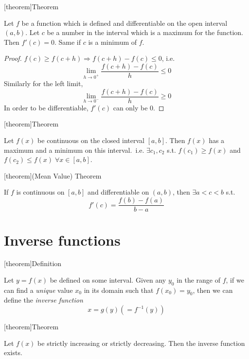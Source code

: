 \documentclass[12pt]{report}
\theoremstyle{definition}
\begin{document}
[theorem]{Theorem}
\begin{max point in an interval}
    Let $f$ be a function which is defined and differentiable on the open interval $(a,b)$.
    Let $c$ be a number in the interval which is a maximum for the function. Then $f'(c) = 0$.
    Same if $c$ is a minimum of $f$.
\end{max point in an interval}
\begin{proof}
    $f(c) \ge f(c+h) \Rightarrow f(c+h) - f(c) \le 0$, i.e.\[
        \lim_{h \rightarrow 0^{+}} \frac{f(c+h) - f(c)}{h} \le 0
    \]Similarly for the left limit, \[
    \lim_{h \rightarrow 0^{-}} \frac{f(c+h) - f(c)}{h} \ge 0
\]In order to be differentiable, $f'(c)$ can only be 0.
\end{proof}

[theorem]{Theorem}
\begin{max and min in an interval}
    Let $f(x)$ be continuous on the closed interval $[a,b]$. 
    Then $f(x)$ has a maximum and a minimum on this interval.\
    i.e. $\exists c_1, c_2$ s.t. $f(c_1) \ge f(x)$ and $f(c_2) \le f(x) \;\forall x \in [a,b]$.
\end{max and min in an interval}

[theorem]{(Mean Value) Theorem}
\begin{MVT}
    If $f$ is continuous on $[a,b]$ and differentiable on $(a,b)$, 
    then $\exists a < c < b$ s.t. \[
        f'(c) = \frac{f(b) - f(a)}{b-a}
    \]
\end{MVT}

\section{Inverse functions}

[theorem]{Definition}
\begin{inverse function}
    Let $y = f(x)$ be defined on some interval. Given any $y_0$ in the range of $f$, if we can find a \emph{unique}
    value $x_0$ in its domain such that $f(x_0) = y_0$, then we can define the \emph{inverse function}\[
        x = g(y) ( = f^{-1}(y) )
    \]
\end{inverse function}

[theorem]{Theorem}
\begin{strictly increasing function has inverse}
    Let $f(x)$ be strictly increasing or strictly decreasing. Then the inverse function exists.
\end{strictly increasing function has inverse}
\end{document}
